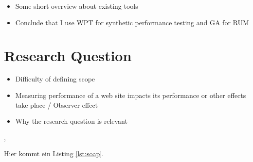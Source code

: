 
\begin{itemize}
\item Some short overview about existing tools
\item Conclude that I use WPT for synthetic performance testing and GA for RUM
\end{itemize}










\section{Research Question}

\begin{itemize}
\item Difficulty of defining scope
\item Measuring performance of a web site impacts its performance or other effects take place / Observer effect
\item Why the research question is relevant
\end{itemize}





























\cite{Gray1981}, \cite{Cerami2002}

\noindent Hier kommt ein Listing \ref{lst:soap}.

